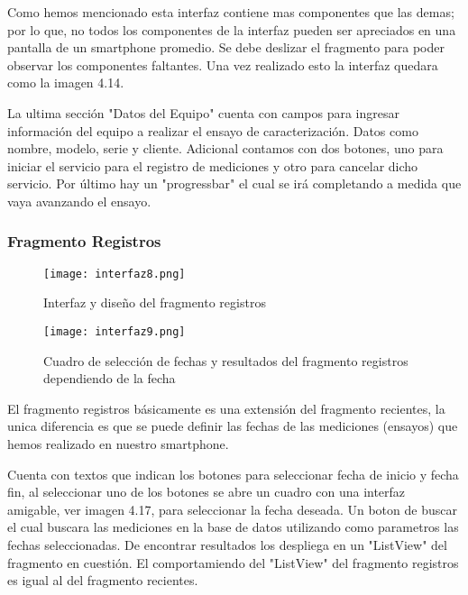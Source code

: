 \par \noindent
Como hemos mencionado esta interfaz contiene mas componentes que las demas; por lo que, no todos los componentes de la interfaz pueden ser apreciados en una pantalla de un smartphone promedio. Se debe deslizar el fragmento para poder observar los componentes faltantes. Una vez realizado esto la interfaz quedara como la imagen 4.14. 

\par \noindent
La ultima sección "Datos del Equipo" cuenta con campos para ingresar información del equipo a realizar el ensayo de caracterización. Datos como nombre, modelo, serie y cliente. Adicional contamos con dos botones, uno para iniciar el servicio  para el registro de mediciones y otro para cancelar dicho servicio. Por último hay un "progressbar" el cual se irá completando a medida que vaya avanzando el ensayo.

\subsubsection{Fragmento Registros}

\begin{figure}[H]
	\centering
	\texttt{[image: interfaz8.png]}
	\caption{Interfaz y diseño del fragmento registros}
\end{figure}

\begin{figure}[H]
	\centering
	\texttt{[image: interfaz9.png]}
	\caption{Cuadro de selección de fechas y resultados del fragmento registros dependiendo de la fecha}
\end{figure}

\par
El fragmento registros básicamente es una extensión del fragmento recientes, la unica diferencia es que se puede definir las fechas de las mediciones (ensayos) que hemos realizado en nuestro smartphone. 

\par \noindent
Cuenta con textos que indican los botones para seleccionar fecha de inicio y fecha fin, al seleccionar uno de los botones se abre un cuadro con una interfaz amigable, ver imagen 4.17, para seleccionar la fecha deseada. Un boton de buscar el cual buscara las mediciones en la base de datos utilizando como parametros las fechas seleccionadas. De encontrar resultados los despliega en un "ListView" del fragmento en cuestión. El comportamiendo del "ListView" del fragmento registros es igual al del fragmento recientes.

